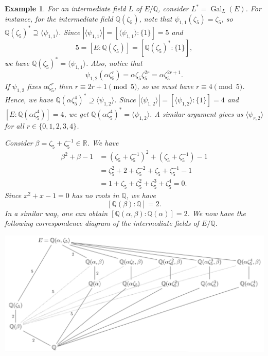 \documentclass[10pt]{article}
\newcommand{\R}{\mathbb{R}}
\newcommand{\Q}{\mathbb{Q}}
\DeclareMathOperator{\Gal}{Gal}
\theoremstyle{newstyle}
\newtheorem{exmp}[thm]{Example}
\begin{document}
\begin{exmp}
For an intermediate field $L$ of $E/\Q$, consider $L^* = \Gal_L(E)$. For instance, for the 
intermediate field $\Q(\zeta_5)$, note that $\psi_{1,1}(\zeta_5) = \zeta_5$, so 
$\Q(\zeta_5)^* \supseteq \langle \psi_{1,1} \rangle$. Since $|\langle \psi_{1,1} \rangle| 
= [\langle \psi_{1,1} \rangle : \{1\}] = 5$ and 
\[ 5 = [E : \Q(\zeta_5)] = [\Q(\zeta_5)^* : \{1\}], \]
we have $\Q(\zeta_5)^* = \langle \psi_{1,1} \rangle$. Also, notice that 
\[ \psi_{1,2}(\alpha\zeta_5^r) = \alpha\zeta_5 \zeta_5^{2r} = \alpha \zeta_5^{2r+1}. \]
If $\psi_{1,2}$ fixes $\alpha\zeta_5^r$, then $r \equiv 2r + 1 \pmod 5$, so we must have 
$r \equiv 4 \pmod 5$. Hence, we have $\Q(\alpha\zeta_5^4)^* \supseteq \langle \psi_{1,2} \rangle$.
Since $|\langle \psi_{1,2} \rangle| = [\langle \psi_{1,2} \rangle : \{1\}] = 4$ and 
$[E : \Q(\alpha\zeta_5^4)] = 4$, we get $\Q(\alpha\zeta_5^4)^* = \langle \psi_{1,2} \rangle$. 
A similar argument gives us $\langle \psi_{r,2} \rangle$ for all $r \in \{0, 1, 2, 3, 4\}$. 

Consider $\beta = \zeta_5 + \zeta_5^{-1} \in \R$. We have 
\begin{align*}
    \beta^2 + \beta - 1 
    &= (\zeta_5 + \zeta_5^{-1})^2 + (\zeta_5 + \zeta_5^{-1}) - 1 \\
    &= \zeta_5^2 + 2 + \zeta_5^{-2} + \zeta_5 + \zeta_5^{-1} - 1 \\
    &= 1 + \zeta_5 + \zeta_5^2 + \zeta_5^3 + \zeta_5^4 
    = 0.
\end{align*}
Since $x^2 + x - 1 = 0$ has no roots in $\Q$, we have 
\[ [\Q(\beta) : \Q] = 2. \]
In a similar way, one can obtain $[\Q(\alpha, \beta) : \Q(\alpha)] = 2$. We now have the following 
correspondence diagram of the intermediate fields of $E/\Q$. 

\begin{center} \includegraphics[width=\textwidth]{9-14-3.png} \end{center}
\end{exmp}
\end{document}
